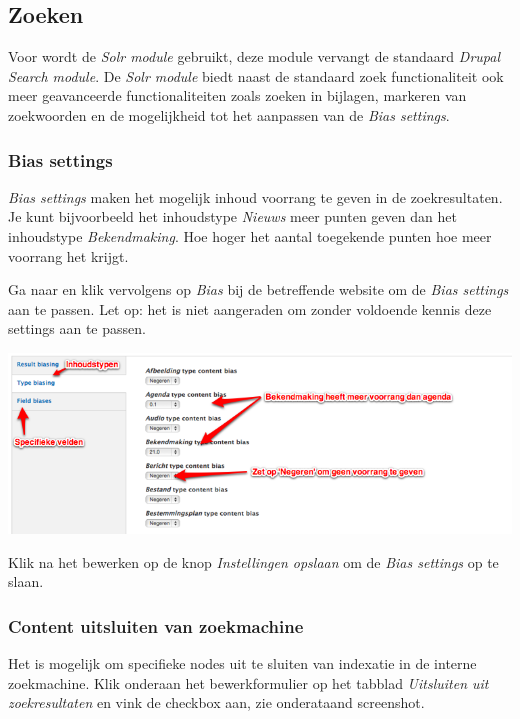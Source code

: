
\subsection{Zoeken}\label{zoeken}

Voor \drupalpath wordt de \emph{Solr module} gebruikt, deze module vervangt de standaard \emph{Drupal Search module}. 
De \emph{Solr module} biedt naast de standaard zoek functionaliteit ook meer geavanceerde functionaliteiten zoals zoeken in bijlagen, markeren van zoekwoorden en de mogelijkheid tot het aanpassen van de \emph{Bias settings}. 

\subsubsection{Bias settings}

\emph{Bias settings} maken het mogelijk inhoud voorrang te geven in de zoekresultaten. Je kunt bijvoorbeeld het inhoudstype \emph{Nieuws} meer punten geven dan het inhoudstype \emph{Bekendmaking}. Hoe hoger het aantal toegekende punten hoe meer voorrang het krijgt. 

Ga naar  en klik vervolgens op \emph{Bias} bij de betreffende website om de \emph{Bias settings} aan te passen. Let op: het is niet aangeraden om zonder voldoende kennis deze settings aan te passen.

\begin{center}
	\includegraphics[width=\textwidth]{img/bias.png}
\end{center}

Klik na het bewerken op de knop \emph{Instellingen opslaan} om de \emph{Bias settings} op te slaan. 

\subsubsection{Content uitsluiten van zoekmachine}

Het is mogelijk om specifieke nodes uit te sluiten van indexatie in de interne zoekmachine. Klik onderaan het bewerkformulier op het tabblad \emph{Uitsluiten uit zoekresultaten} en vink de checkbox aan, zie onderataand screenshot.

